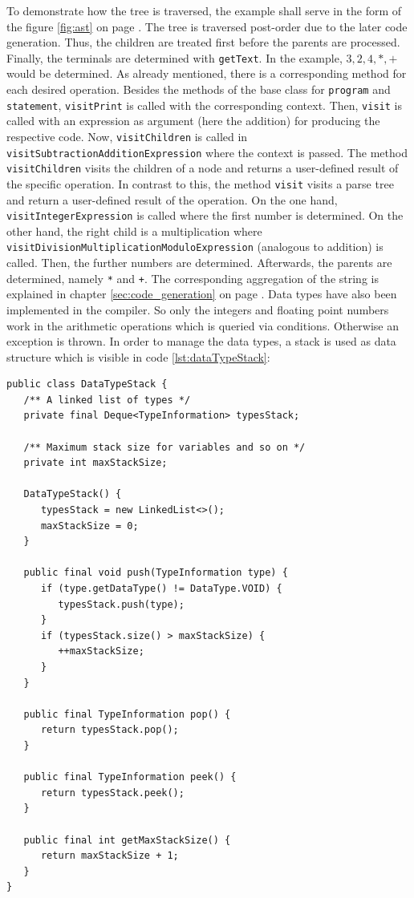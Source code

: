 To demonstrate how the tree is traversed, the example shall serve in the form of the figure \ref{fig:ast} on page \pageref{fig:ast}. The tree is traversed post-order due to the later code generation. Thus, the children are treated first before the parents are processed. Finally, the terminals are determined with \texttt{getText}. In the example, $3, 2, 4, *, +$ would be determined. As already mentioned, there is a corresponding method for each desired operation. Besides the methods of the base class for \texttt{program} and \texttt{statement}, \texttt{visitPrint} is called with the corresponding context. Then, \texttt{visit} is called with an expression as argument (here the addition) for producing the respective code. Now, \texttt{visitChildren} is called in \texttt{visitSubtractionAdditionExpression} where the context is passed. The method \texttt{visitChildren} visits the children of a node and returns a user-defined result of the specific operation. In contrast to this, the method \texttt{visit} visits a parse tree and return a user-defined result of the operation. On the one hand, \texttt{visitIntegerExpression} is called where the first number is determined. On the other hand, the right child is a multiplication where \texttt{visitDivisionMultiplicationModuloExpression} (analogous to addition) is called. Then, the further numbers are determined. Afterwards, the parents are determined, namely \texttt{*} and \texttt{+}. The corresponding aggregation of the string is explained in chapter \ref{sec:code_generation} on page \pageref{sec:code_generation}. Data types have also been implemented in the compiler. So only the integers and floating point numbers work in the arithmetic operations which is queried via conditions. Otherwise an exception is thrown. In order to manage the data types, a stack is used as data structure which is visible in code \ref{lst:dataTypeStack}:

\begin{lstlisting}[frame=htrbl, caption={Implementation of {\ttfamily DataTypeStack.java}}, label={lst:dataTypeStack}, basicstyle=\footnotesize]
public class DataTypeStack {
   /** A linked list of types */
   private final Deque<TypeInformation> typesStack;

   /** Maximum stack size for variables and so on */
   private int maxStackSize;

   DataTypeStack() {
      typesStack = new LinkedList<>();
      maxStackSize = 0;
   }

   public final void push(TypeInformation type) {
      if (type.getDataType() != DataType.VOID) {
         typesStack.push(type);
      }
      if (typesStack.size() > maxStackSize) {
         ++maxStackSize;
      }
   }

   public final TypeInformation pop() {
      return typesStack.pop();
   }

   public final TypeInformation peek() {
      return typesStack.peek();
   }

   public final int getMaxStackSize() {
      return maxStackSize + 1;
   }
}
\end{lstlisting}

